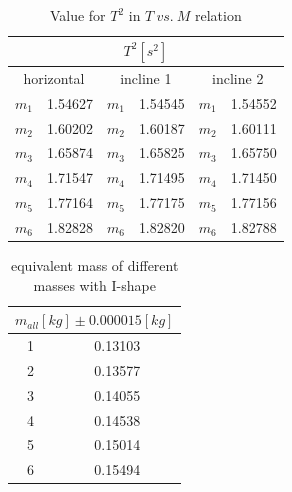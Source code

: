 \documentclass[11pt,a4paper]{article}
\begin{document}
        \begin{table}[H]
            \centering
            \begin{tabular}{|c|c|c|c|c|c|}
            \hline
            \multicolumn{6}{|c|}{$T^2[s^2]$}                                                                   \\ \hline
            \multicolumn{2}{|c|}{horizontal} & \multicolumn{2}{c|}{incline 1} & \multicolumn{2}{c|}{incline 2} \\ \hline
            $m_1$          & 1.54627         & $m_1$         & 1.54545        & $m_1$         & 1.54552        \\ \hline
            $m_2$          & 1.60202         & $m_2$         & 1.60187        & $m_2$         & 1.60111        \\ \hline
            $m_3$          & 1.65874         & $m_3$         & 1.65825        & $m_3$         & 1.65750        \\ \hline
            $m_4$          & 1.71547         & $m_4$         & 1.71495        & $m_4$         & 1.71450        \\ \hline
            $m_5$          & 1.77164         & $m_5$         & 1.77175        & $m_5$         & 1.77156        \\ \hline
            $m_6$          & 1.82828         & $m_6$         & 1.82820        & $m_6$         & 1.82788        \\ \hline
            \end{tabular}
            \caption{Value for $T^2$ in $T\ vs.\ M$ relation}
            \label{valueT2}
            \end{table}
            \begin{table}[H]
                \centering
                \begin{tabular}{|c|c|}
                \hline
                \multicolumn{2}{|c|}{$m_{all}[kg]\pm0.000015[kg]$} \\ \hline
                1                   & 0.13103                   \\ \hline
                2                   & 0.13577                   \\ \hline
                3                   & 0.14055                   \\ \hline
                4                   & 0.14538                   \\ \hline
                5                   & 0.15014                   \\ \hline
                6                   & 0.15494                   \\ \hline
                \end{tabular}
                \caption{equivalent mass of different masses with I-shape}
                \label{equivalent2}
                \end{table}
\end{document}
